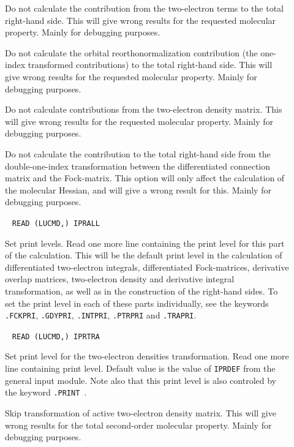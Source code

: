 \begin{description}
\item[] Do not calculate the contribution from the
two-electron terms to the total right-hand side. This will give wrong
results for the requested molecular property. Mainly for debugging
purposes.

\item[] Do not calculate the orbital reorthonormalization
contribution (the one-index transformed contributions) to the total
right-hand side. This will give wrong results for the requested
molecular property. Mainly for debugging purposes.

\item[] Do not calculate contributions from the two-electron
density matrix. This will give wrong results for the requested
molecular property. Mainly for debugging purposes.

\item[] Do not calculate the contribution to the total
right-hand side from the double-one-index
transformation between the differentiated connection matrix and the
Fock-matrix. This option will only affect the calculation of the molecular
Hessian, and will give a wrong result for this. Mainly for debugging
purposes. 

\item[]\verb| |\newline
\verb|READ (LUCMD,) IPRALL|

Set print levels.  Read one more line containing the print level for
this part of the calculation.  This will be the default print
level in the calculation of differentiated two-electron integrals,
differentiated Fock-matrices, derivative
overlap matrices, two-electron density and derivative integral
transformation, as well as in the construction of the right-hand sides.
To set the print level in each of these parts individually, see the
keywords \verb|.FCKPRI|, \verb|.GDYPRI|, \verb|.INTPRI|,
\verb|.PTRPRI| and \verb|.TRAPRI|.

\item[]\verb| |\newline
\verb|READ (LUCMD,) IPRTRA|

Set print level for the  two-electron densities transformation. Read
one more line containing print level. 
Default value is the value of  \verb|IPRDEF| from the general input
module. Note also that this print level is also controled by the keyword
\verb|.PRINT |. 

\item[] Skip transformation of active two-electron
density matrix. This will give wrong results for the total
second-order molecular property. Mainly for debugging purposes.


\end{description}
